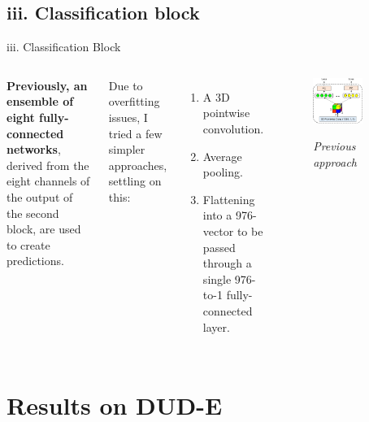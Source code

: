\documentclass[aspectratio=169,xcolor=dvipsnames]{beamer}
\begin{document}
\subsection{iii. Classification block}
\begin{frame}{iii. Classification Block}
    \begin{columns}[c]
        \textbf{Previously, an ensemble of eight fully-connected networks}, derived from the eight channels of the output of the second block, are used to create predictions.
        
        Due to overfitting issues, I tried a few simpler approaches, settling on this:
        \begin{enumerate}
            \item A 3D pointwise convolution.
            \item Average pooling.
            \item Flattening into a 976-vector to be passed through a single 976-to-1 fully-connected layer.
        \end{enumerate}
        \begin{figure}
            \includegraphics[width=0.7\textwidth]{images/gar_block}\par
            \textit{Previous approach}
        \end{figure}
    \end{columns}
\end{frame}


\section{Results on DUD-E}
\end{document}
